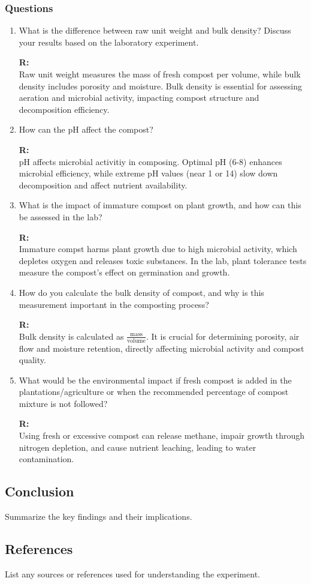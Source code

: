 \documentclass{article}
\begin{document}
\subsubsection{Questions}
\begin{enumerate}
    \item What is the difference between raw unit weight and bulk density? Discuss your
        results based on the laboratory experiment.

        \textbf{R:\\}
            Raw unit weight measures the mass of fresh compost per volume, while
            bulk density includes porosity and moisture. Bulk density is essential for
            assessing aeration and microbial activity, impacting compost structure and
            decomposition efficiency.

    \item How can the pH affect the compost?
    
        \textbf{R:\\}
            pH affects microbial activitiy in composing. Optimal pH (6-8) enhances microbial
            efficiency, while extreme pH values (near 1 or 14) slow down decomposition and
            affect nutrient availability.

    \item What is the impact of immature compost on plant growth, and how can this be
        assessed in the lab?

        \textbf{R:\\}
            Immature compst harms plant growth due to high microbial activity, which
            depletes oxygen and releases toxic substances. In the lab, plant tolerance tests
            measure the compost's effect on germination and growth.

    \item How do you calculate the bulk density of compost, and why is this measurement
        important in the composting process?

        \textbf{R:\\}
            Bulk density is calculated as $\frac{\text{mass}}{\text{volume}}$. It is crucial for
            determining porosity, air flow and moisture retention, directly affecting
            microbial activity and compost quality.

    \item What would be the environmental impact if fresh compost is added in the
        plantations/agriculture or when the recommended percentage of compost mixture
        is not followed?

        \textbf{R:\\}
            Using fresh or excessive compost can release methane, impair growth through
            nitrogen depletion, and cause nutrient leaching, leading to water contamination.

\end{enumerate}

\subsection{Conclusion}
Summarize the key findings and their implications.

\subsection{References}
List any sources or references used for understanding the experiment.
\end{document}
